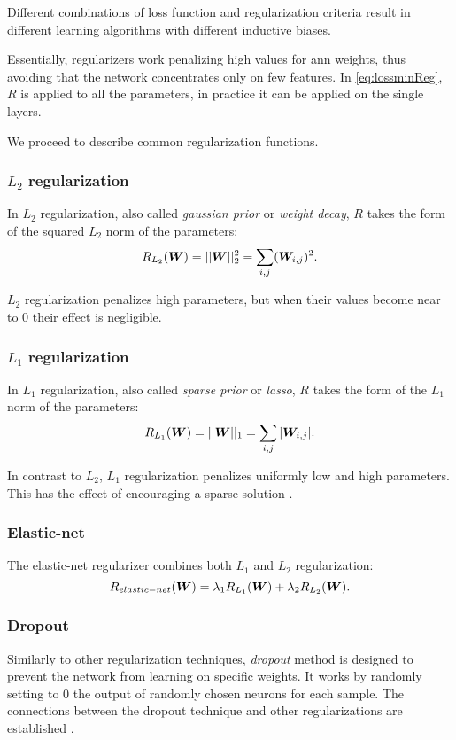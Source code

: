 Different combinations of loss function and regularization criteria
result in different learning algorithms with different inductive
biases.

Essentially, regularizers work penalizing high values for \ac{ann}
weights, thus avoiding that the network concentrates only on few
features. In \eqref{eq:lossminReg}, $R$ is applied to all the
parameters, in practice it can be applied on the single layers.

We proceed to describe common regularization functions.

\subsubsection{$L_2$ regularization}
In $L_2$ regularization, also called \emph{gaussian prior} or
\emph{weight decay}, $R$ takes the form of the squared $L_2$ norm
of the parameters:
\begin{equation*}
  R_{L_2}(\bm{W})=||\bm{W}||_2^2=\sum_{i,j}(\bm{W}_{i,j})^2.
\end{equation*}

$L_2$ regularization penalizes high parameters, but when their values
become near to $0$ their effect is negligible.

\subsubsection{$L_1$ regularization}
In $L_1$ regularization, also called \emph{sparse prior} or
\emph{lasso}, $R$ takes the form of the $L_1$ norm of the parameters:
\begin{equation*}
  R_{L_1}(\bm{W})=||\bm{W}||_1=\sum_{i,j}|\bm{W}_{i,j}|.
\end{equation*}

In contrast to $L_2$, $L_1$ regularization penalizes uniformly low and
high parameters. This has the effect of encouraging a sparse solution
\cite{tibshirani1996regression}.

\subsubsection{Elastic-net}
The elastic-net regularizer \cite{zou2005regularization} combines both
$L_1$ and $L_2$ regularization:
\begin{equation*}
  R_{elastic-net}(\bm{W})=\lambda_1R_{L_1}(\bm{W})+\lambda_2R_{L_2}(\bm{W}).
\end{equation*}

\subsubsection{Dropout}
Similarly to other regularization techniques, \emph{dropout} method
\cite{hinton2012improving} is designed to prevent the network from
learning on specific weights. It works by randomly setting to $0$ the
output of randomly chosen neurons for each sample. The connections
between the dropout technique and other regularizations are
established \cite{wager2013dropout}.
